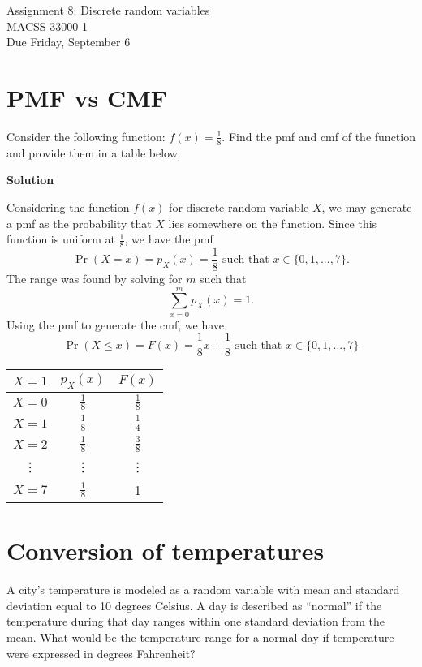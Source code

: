 \documentclass[12pt]{article}
\begin{document}
	\begin{center}
		Assignment 8: Discrete random variables\\
        MACSS 33000 1 \\
		Due Friday, September 6 \\
	\end{center}

\section{PMF vs CMF}

Consider the following function: $f(x) = \frac{1}{8}$. Find the pmf and cmf of the function and provide them in a table below.

\textbf{Solution}

Considering the function $f(x)$ for discrete random variable $X$, we may generate a pmf as the probability that $X$ lies somewhere on the function. Since this function is uniform at $\frac{1}{8}$, we have the pmf \[\Pr(X=x)= p_X(x) = \frac{1}{8} \text{ such that } x \in \{0,1,...,7\}. \]
The range was found by solving for $m$ such that \[ \sum_{x=0}^m p_X(x)=1.\]
Using the pmf to generate the cmf, we have 
\[ \Pr(X \leq x) = F(x) = \frac{1}{8}x+\frac{1}{8} 
\text{ such that } x \in \{0,1,...,7\}\]


\begin{center}
\begin{tabular}{ c |c |c  }
 $X=1$ & $p_X(x)$ & $F(x)$ 
 \\  \hline 
 $X=0$ &  $\frac{1}{8}$ & $\frac{1}{8}$\\  
 $X=1 $& $\frac{1}{8}$& $\frac{1}{4}$ \\  
 $X=2$&  $\frac{1}{8}$ & $\frac{3}{8}$
 \\ \vdots & \vdots &\vdots
 \\ $X=7$ & $\frac{1}{8}$ & 1
 \end{tabular}
\end{center}

\section{Conversion of temperatures}
A city’s temperature is modeled as a random variable with mean and standard deviation equal to 10 degrees Celsius. A day is described as “normal” if the temperature during that day ranges within one standard deviation from the mean. What would be the temperature range for a normal day if temperature were expressed in degrees Fahrenheit?
\end{document}
